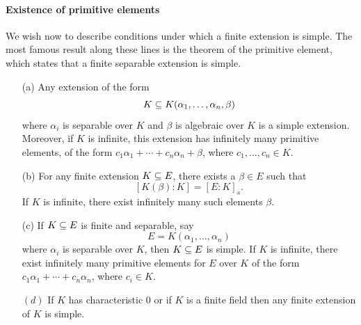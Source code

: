 \paragraph{Existence of primitive elements}
We wish now to describe conditions under which a finite extension is simple. The most famous result along these lines is the theorem of the primitive element, which states that a finite separable extension is simple.
\begin{theorem}\label{field ext primitive element}
\mbox{}
\begin{itemize}
\item[(a)] Any extension of the form
\[K\subseteq K(\alpha_1,\dots,\alpha_n,\beta)\]
where $\alpha_i$ is separable over $K$ and $\beta$ is algebraic over $K$ is a simple extension. Moreover, if $K$ is infinite, this extension has infinitely many primitive elements, of the form $c_1\alpha_1+\cdots+c_n\alpha_n+\beta$, where $c_1,\dots,c_n\in K$.
\item[(b)] For any finite extension $K\subseteq E$, there exists a $\beta\in E$ such that
\[[K(\beta):K]=[E:K]_s.\]
If $K$ is infinite, there exist infinitely many such elements $\beta$.
\item[(c)] If $K\subseteq E$ is finite and separable, say
\[E=K(\alpha_1,\dots,\alpha_n)\]
where $\alpha_i$ is separable over $K$, then $K\subseteq E$ is simple. If $K$ is infinite, there exist infinitely many primitive elements for $E$ over $K$ of the form $c_1\alpha_1+\cdots+c_n\alpha_n$, where $c_i\in K$.
\item[$(d)$] If $K$ has characteristic $0$ or if $K$ is a finite field then any finite extension of $K$ is simple.
\end{itemize}
\end{theorem}
